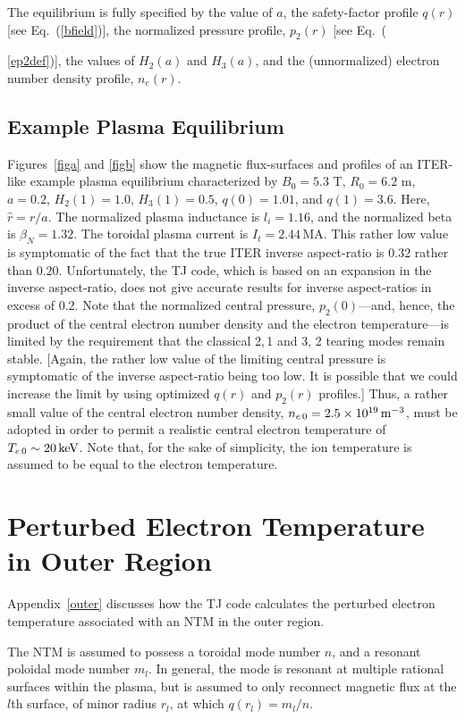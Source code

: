 \documentclass{iopjournal}
\begin{document}
The equilibrium is fully specified by  the value of $a$, the safety-factor profile $q(r)$ [see Eq.~(\ref{bfield})], the normalized pressure profile, $p_2(r)$ [see Eq.~({\ref{ep2def})], the values of $H_2(a)$ and $H_3(a)$, and the (unnormalized) electron number density profile, $n_e(r)$. 

\subsection{Example Plasma Equilibrium}
Figures~\ref{figa} and \ref{figb} show the magnetic flux-surfaces and profiles of an ITER-like  example plasma equilibrium characterized by 
$B_0=5.3$ T, $R_0=6.2$ m, $a=0.2$, $H_2(1)=1.0$,  $H_3(1)= 0.5$, $q(0)=1.01$, and  $q(1)=3.6$.  Here, $\hat{r}=r/a$. The normalized plasma inductance is
$l_i=1.16$, and the normalized beta is $\beta_N= 1.32$.
The toroidal plasma current is $I_t=2.44$\,MA. This rather low value
is symptomatic of the fact that the true ITER inverse aspect-ratio is  $0.32$ rather than $0.20$. Unfortunately, the TJ code, which is based on
an expansion in the inverse aspect-ratio,  does not give accurate results for inverse aspect-ratios
in excess of 0.2. 
Note that the normalized central pressure, $p_2(0)$---and, hence, the product of the central electron number density and the electron temperature---is  limited by the requirement that the classical
 2,\,1 and 3, 2 tearing modes remain stable.  [Again, the rather low value of the limiting central pressure is symptomatic of the inverse aspect-ratio being
 too low. It is possible that we could increase the limit by using optimized $q(r)$ and $p_2(r)$ profiles.]
Thus,  a rather small value of the central electron number density, $n_{e\,0}=2.5\times 10^{19}\,{\rm m}^{-3}$, 
must be adopted  in order to permit a realistic central electron  temperature of $T_{e\,0}\sim 20\,{\rm keV}$. Note that, for the sake of simplicity,  the ion temperature is assumed to
be equal to the electron temperature.

\section{Perturbed Electron Temperature  in Outer Region}\label{s3}
Appendix~\ref{outer} discusses how the TJ code calculates the perturbed electron temperature associated with an NTM in the outer region.

The NTM is assumed to possess a toroidal mode number $n$, and a resonant poloidal mode number $m_l$. In general, the mode is
resonant at multiple rational surfaces within the plasma, but is assumed to only reconnect magnetic flux at the $l$th surface, of minor
radius $r_l$, at which $q(r_l)=m_l/n$. 

}
\end{document}
